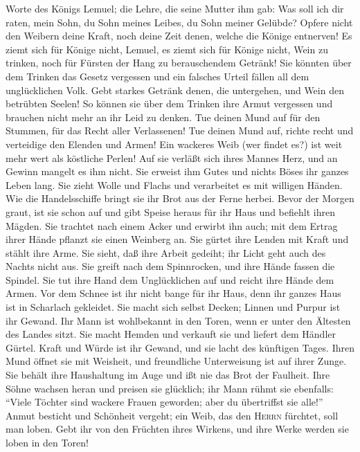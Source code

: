  Worte des Königs Lemuel; die Lehre, die seine Mutter ihm
gab:  Was soll ich dir raten, mein Sohn, du Sohn meines
Leibes, du Sohn meiner Gelübde?  Opfere nicht den Weibern
deine Kraft, noch deine Zeit denen, welche die Könige entnerven!
 Es ziemt sich für Könige nicht, Lemuel, es ziemt sich für
Könige nicht, Wein zu trinken, noch für Fürsten der Hang zu
berauschendem Getränk!  Sie könnten über dem Trinken das
Gesetz vergessen und ein falsches Urteil fällen all dem unglücklichen
Volk.  Gebt starkes Getränk denen, die untergehen, und
Wein den betrübten Seelen!  So können sie über dem Trinken
ihre Armut vergessen und brauchen nicht mehr an ihr Leid zu denken.
 Tue deinen Mund auf für den Stummen, für das Recht aller
Verlassenen!  Tue deinen Mund auf, richte recht und
verteidige den Elenden und Armen!  Ein wackeres Weib (wer
findet es?) ist weit mehr wert als köstliche Perlen!  Auf
sie verläßt sich ihres Mannes Herz, und an Gewinn mangelt es ihm nicht.
 Sie erweist ihm Gutes und nichts Böses ihr ganzes Leben
lang.  Sie zieht Wolle und Flachs und verarbeitet es mit
willigen Händen.  Wie die Handelsschiffe bringt sie ihr
Brot aus der Ferne herbei.  Bevor der Morgen graut, ist
sie schon auf und gibt Speise heraus für ihr Haus und befiehlt ihren
Mägden.  Sie trachtet nach einem Acker und erwirbt ihn
auch; mit dem Ertrag ihrer Hände pflanzt sie einen Weinberg an.
 Sie gürtet ihre Lenden mit Kraft und stählt ihre Arme.
 Sie sieht, daß ihre Arbeit gedeiht; ihr Licht geht auch
des Nachts nicht aus.  Sie greift nach dem Spinnrocken,
und ihre Hände fassen die Spindel.  Sie tut ihre Hand dem
Unglücklichen auf und reicht ihre Hände dem Armen.  Vor
dem Schnee ist ihr nicht bange für ihr Haus, denn ihr ganzes Haus ist in
Scharlach gekleidet.  Sie macht sich selbst Decken;
Linnen und Purpur ist ihr Gewand.  Ihr Mann ist
wohlbekannt in den Toren, wenn er unter den Ältesten des Landes sitzt.
 Sie macht Hemden und verkauft sie und liefert dem
Händler Gürtel.  Kraft und Würde ist ihr Gewand, und sie
lacht des künftigen Tages.  Ihren Mund öffnet sie mit
Weisheit, und freundliche Unterweisung ist auf ihrer Zunge.
 Sie behält ihre Haushaltung im Auge und ißt nie das Brot
der Faulheit.  Ihre Söhne wachsen heran und preisen sie
glücklich; ihr Mann rühmt sie ebenfalls:  ``Viele Töchter
sind wackere Frauen geworden; aber du übertriffst sie alle!''
 Anmut besticht und Schönheit vergeht; ein Weib, das den
\textsc{Herrn} fürchtet, soll man loben.  Gebt ihr von
den Früchten ihres Wirkens, und ihre Werke werden sie loben in den
Toren!
